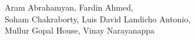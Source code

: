 

\begin{frame}
    \titlepage

    \begin{center}
        \small

    Aram Abrahamyan, Fardin Ahmed, \\ Soham Chakraborty, Luis David Landicho Antonio, \\ Mullur Gopal House,  Vinay Narayanappa
    \end{center}
\end{frame}
